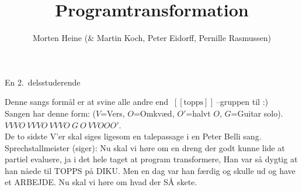 \documentclass[10pt]{article}
\title{Programtransformation}
\author{Morten Heine (\& Martin Koch, Peter Eidorff, Pernille Rasmussen)}
\newcommand{\sem}[1]{~[\![#1]\!]~}
\begin{document}
\maketitle

\begin{roles}
   En 2.\ delsstuderende
\end{roles}

\scene Denne sangs formål er at svine alle andre end
  $\sem{\mbox{topps}}$--gruppen til :)\\ Sangen har denne form:
  ($V$=Vers, $O$=Omkvæd, $O'$=halvt $O$, $G$=Guitar solo).\\ 
  $VVVO\ VVVO\ VVVO\ G\ O\ VVOOO'$.\\ 
  De to sidste V'er skal siges ligesom en talepassage i en Peter Belli
  sang.\\ Sprechstallmeister (siger): Nu skal vi høre om en dreng der godt
  kunne lide at partiel evaluere, ja i det hele taget at program
  transformere, Han var så dygtig at han nåede til TOPPS på DIKU.  Men en
  dag var han færdig og skulle ud og have et ARBEJDE.  Nu skal vi høre om
  hvad der SÅ skete.\bigskip

\end{document}
